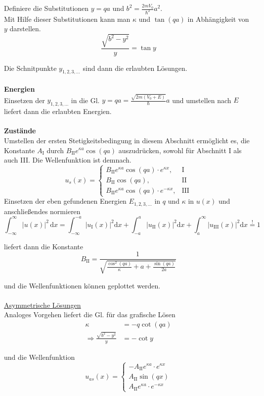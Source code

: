\documentclass{article}
\newcommand{\diff}{\mathrm{d}}
\begin{document}
{Definiere die Substitutionen $y = q a$ und $b^2 = \frac{2mV_0}{\hbar^2}a^2$.\\
Mit Hilfe dieser Substitutionen kann man $\kappa$ und $\tan(qa)$ in Abhängigkeit von $y$ darstellen. 
	$$\frac{\sqrt{b^2 - y^2}}{y} = \tan y$$

Die Schnitpunkte $y_{1,2,3,...}$ sind dann die erlaubten Lösungen.\\
\\
\textbf{Energien}\\
Einsetzen der $y_{1,2,3,...}$ in die Gl. $y = q a = \frac{\sqrt{2m(V_0 + E)}}{\hbar} a$ und umstellen nach $E$ liefert dann die erlaubten Energien.\\
\\
\textbf{Zustände}\\
Umstellen der ersten Stetigkeitsbedingung in diesem Abschnitt ermöglicht es, die Konstante $A_\text{I}$ durch $B_\text{II} e^{\kappa a}\cos(qa)$ auszudrücken, sowohl für Abschnitt I als auch III. Die Wellenfunktion ist demnach.
	$$u_s(x) = 
	\begin{cases}
		B_\text{II} e^{\kappa a}\cos(qa) \cdot e^{\kappa x}, & \text{I}\\
		B_\text{II} \cos(qa), & \text{II} \\
		B_\text{II} e^{\kappa a}\cos(qa) \cdot e^{-\kappa x}, & \text{III}
	\end{cases}$$
Einsetzen der eben gefundenen Energien $E_{1,2,3,...}$ in $q$ und $\kappa$ in $u(x)$ und anschließendes normieren
	$$\int_{-\infty}^\infty |u(x)|^2\,\diff x = \int_{-\infty}^{-a} |u_\text{I}(x)|^2 \diff x + \int_{-a}^a |u_\text{II}(x)|^2 \diff x + \int_a^\infty |u_\text{III}(x)|^2 \diff x \stackrel{!}{=} 1$$


\newpage


liefert dann die Konstante 
	$$B_\text{II} = \frac{1}{\sqrt{\frac{\cos^2(qa)}{\kappa} + a + \frac{\sin(qa)}{2a}}}$$ 

und die Wellenfunktionen können geplottet werden.\\
\\
\underline{Asymmetrische Lösungen}\\
Analoges Vorgehen liefert die Gl. für das grafische Lösen
	\begin{align*}
		\kappa &= -q\cot(qa) \\
		\Rightarrow \frac{\sqrt{b^2 - y^2}}{y} &= -\cot y
	\end{align*}
	
und die Wellenfunktion
	$$u_{as}(x) = 
	\begin{cases}
		-A_\text{II}e^{\kappa a} \cdot e^{\kappa x} \\
		A_\text{II}\sin(qx) \\
		A_\text{II}e^{\kappa a} \cdot e^{-\kappa x}		
	\end{cases}$$
	
}
\end{document}
